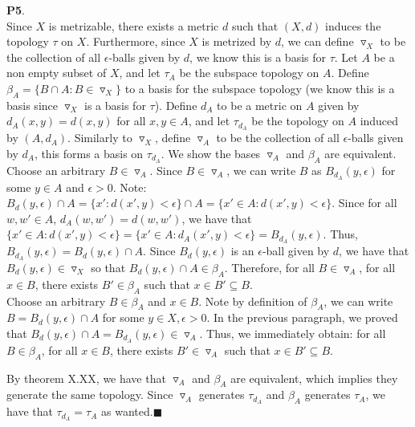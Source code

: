 \documentclass{article}
\begin{document}
    \newpage

    \textbf{P5}.\\
    Since $X$ is metrizable, there exists a metric $d$ such that $(X,d)$ induces the topology $\tau$ on $X$. Furthermore, since $X$ is metrized by $d$, we can define
    $\triangledown_X$ to be the collection of all $\epsilon$-balls given by $d$, we know this is a basis for $\tau$. Let $A$ be a non empty subset of $X$, and let
    $\tau_A$ be the subspace topology on $A$. Define $\beta_A = \{B \cap A: B\in\triangledown_X\}$ to a basis for the subspace topology (we know this is a basis
    since $\triangledown_X$ is a basis for $\tau$). Define 
    $d_A$ to be a metric on $A$ given by $d_A(x,y) = d(x,y)$ for all $x,y\in A$, and let $\tau_{d_A}$ be the topology
    on $A$ induced by $(A,d_A)$. Similarly to $\triangledown_X$, define $\triangledown_A$ to be the collection of all $\epsilon$-balls given by $d_A$, this forms a basis
    on $\tau_{d_A}$. We show the bases $\triangledown_A$ and $\beta_A$ are equivalent.\\

    Choose an arbitrary $B\in\triangledown_A$. Since $B\in\triangledown_A$, we can write $B$ as $B_{d_A}(y,\epsilon)$
    for some $y\in A$ and $\epsilon>0$. Note: $B_d(y,\epsilon) \cap A = \{x': d(x',y) < \epsilon\} \cap A = \{x'\in A: d(x',y)<\epsilon\}$.
    Since for all $w,w'\in A$, $d_A(w,w') = d(w,w')$, we have that $\{x'\in A: d(x',y)<\epsilon\} = \{x'\in A: d_A(x',y) < \epsilon\} = B_{d_A}(y,\epsilon)$. Thus,
    $B_{d_A}(y,\epsilon) = B_d(y,\epsilon) \cap A$. Since $B_d(y,\epsilon)$ is an $\epsilon$-ball given by $d$, we have that $B_d(y,\epsilon)\in\triangledown_X$ so that
    $B_d(y,\epsilon)\cap A\in \beta_A$. Therefore, for all $B\in\triangledown_A$, for all $x\in B$, there exists $B'\in\beta_A$ such that $x\in B' \subseteq B$.\\

    Choose an arbitrary $B\in\beta_A$ and $x\in B$. Note by definition of $\beta_A$, we can write $B = B_d(y,\epsilon)\cap A$ for some $y\in X, \epsilon>0$. In the
    previous paragraph, we proved that $B_d(y,\epsilon)\cap A = B_{d_A}(y,\epsilon)\in\triangledown_A$. Thus, we immediately 
    obtain: for all $B\in\beta_A$, for all $x\in B$, there exists $B'\in\triangledown_A$ such that $x\in B'\subseteq B$.

    By theorem X.XX, we have that $\triangledown_A$ and $\beta_A$ are equivalent, which implies they generate the same topology. Since $\triangledown_A$ generates
    $\tau_{d_A}$ and $\beta_A$ generates $\tau_A$, we have that $\tau_{d_A} = \tau_A$ as wanted.\hfill$\blacksquare$\\
\end{document}
